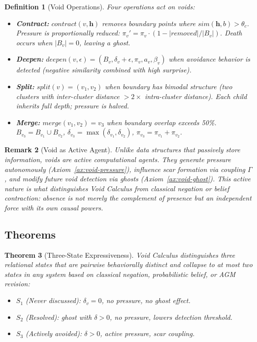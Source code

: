 \documentclass[11pt]{article}
\newtheorem{theorem}{Theorem}[section]
\newtheorem{definition}[theorem]{Definition}
\newtheorem{remark}[theorem]{Remark}
\begin{document}
\begin{definition}[Void Operations]
Four operations act on voids:
\begin{itemize}
\item \textbf{Contract:} $contract(v, \mathbf{h})$ removes boundary points where $sim(\mathbf{h}, b) > \theta_c$. Pressure is proportionally reduced: $\pi_v' = \pi_v \cdot (1 - |removed|/|B_v|)$. Death occurs when $|B_v| = 0$, leaving a ghost.
\item \textbf{Deepen:} $deepen(v, \epsilon) = (B_v, \delta_v + \epsilon, \pi_v, a_v, \beta_v)$ when avoidance behavior is detected (negative similarity combined with high surprise).
\item \textbf{Split:} $split(v) = (v_1, v_2)$ when boundary has bimodal structure (two clusters with inter-cluster distance $> 2 \times$ intra-cluster distance). Each child inherits full depth; pressure is halved.
\item \textbf{Merge:} $merge(v_1, v_2) = v_3$ when boundary overlap exceeds 50\%. $B_{v_3} = B_{v_1} \cup B_{v_2}$, $\delta_{v_3} = \max(\delta_{v_1}, \delta_{v_2})$, $\pi_{v_3} = \pi_{v_1} + \pi_{v_2}$.
\end{itemize}
\end{definition}

\begin{remark}[Void as Active Agent]
Unlike data structures that passively store information, voids are \emph{active computational agents}. They generate pressure autonomously (Axiom~\ref{ax:void-pressure}), influence scar formation via coupling $\Gamma$, and modify future void detection via ghosts (Axiom~\ref{ax:void-ghost}). This active nature is what distinguishes Void Calculus from classical negation or belief contraction: absence is not merely the complement of presence but an independent force with its own causal powers.
\end{remark}

\subsection{Theorems}

\begin{theorem}[Three-State Expressiveness]
\label{thm:void-three-way}
Void Calculus distinguishes three relational states that are pairwise behaviorally distinct and collapse to at most two states in any system based on classical negation, probabilistic belief, or AGM revision:
\begin{itemize}
\item $S_1$ (Never discussed): $\delta_v = 0$, no pressure, no ghost effect.
\item $S_2$ (Resolved): ghost with $\delta > 0$, no pressure, lowers detection threshold.
\item $S_3$ (Actively avoided): $\delta > 0$, active pressure, scar coupling.
\end{itemize}
\end{theorem}
\end{document}
